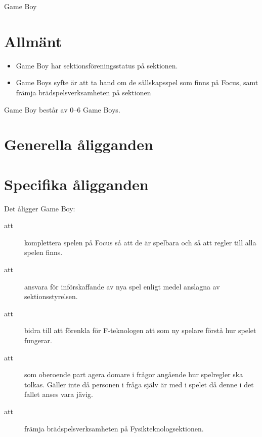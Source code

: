 \documentclass[a4paper]{article}
\begin{document}
\renewcommand{\forening}{Game Boy} %

\begin{foreningenv}{\forening{}} %
    \section{Allmänt}
    \begin{itemize}
        \item Game Boy har sektionsföreningsstatus på sektionen.
        \item Game Boys syfte är att ta hand om de sällskapsspel som finns på Focus, samt främja brädspelsverksamheten på sektionen
    \end{itemize}
    Game Boy består av 0--6 Game Boys.
    
    \section{Generella åligganden}
    \aliggsektfor{}
    
    \section{Specifika åligganden}
    Det åligger \forening{}:
    \begin{description}
        \item[att] komplettera spelen på Focus så att de är spelbara och så att regler till alla spelen finns.
        \item[att] ansvara för införskaffande av nya spel enligt medel anslagna av sektionsstyrelsen.
        \item[att] bidra till att förenkla för F-teknologen att som ny spelare förstå hur spelet fungerar.
        \item[att] som oberoende part agera domare i frågor angående hur spelregler ska tolkas. Gäller inte då personen i fråga själv är med i spelet då denne i det fallet anses vara jävig.
        \item[att] främja brädspelsverksamheten på Fysikteknologsektionen.
    \end{description}
\end{foreningenv}
\end{document}
